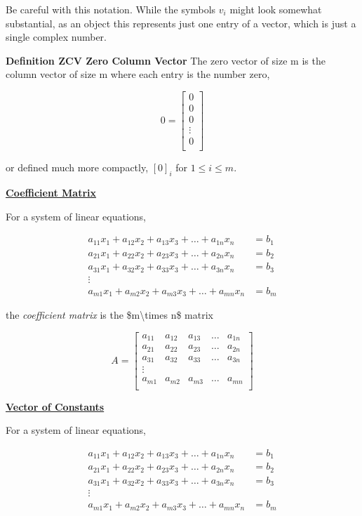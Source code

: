 \documentclass[openany]{book}
\begin{document}
Be careful with this notation. While the symbols \({v}_{i}\) might look
somewhat substantial, as an object this represents just one entry of a
vector, which is just a single complex number.

\textbf{Definition ZCV Zero Column Vector} The zero vector of size m is
the column vector of size m where each entry is the number zero,

\[
0 = \begin{bmatrix}
     0 \\
     0 \\
     0 \\
     \vdots \\
     0 \\
     \end{bmatrix}
\]

or defined much more compactly, \([0]_{i}\) for \(1\leq i\leq m\).

\protect\hyperlink{definition-cm-coefficient-matrix}{\textbf{Coefficient
Matrix}}

For a system of linear equations,

\begin{align*}
a_{11}x_1+a_{12}x_2+a_{13}x_3+\dots+a_{1n}x_n&=b_1\\
a_{21}x_1+a_{22}x_2+a_{23}x_3+\dots+a_{2n}x_n&=b_2\\
a_{31}x_1+a_{32}x_2+a_{33}x_3+\dots+a_{3n}x_n&=b_3\\
\vdots&\\
a_{m1}x_1+a_{m2}x_2+a_{m3}x_3+\dots+a_{mn}x_n&=b_m
\end{align*}

the \emph{coefficient matrix} is the \$m\textbackslash{}times n\$ matrix

\[
A=
\begin{bmatrix}
a_{11}&a_{12}&a_{13}&\dots&a_{1n}\\
a_{21}&a_{22}&a_{23}&\dots&a_{2n}\\
a_{31}&a_{32}&a_{33}&\dots&a_{3n}\\
\vdots&\\
a_{m1}&a_{m2}&a_{m3}&\dots&a_{mn}\\
\end{bmatrix}
\]

\protect\hyperlink{definition-voc-vector-of-constants}{\textbf{Vector of
Constants}}

For a system of linear equations,

\[\begin{aligned}
a_{11}x_1+a_{12}x_2+a_{13}x_3+\dots+a_{1n}x_n&=b_1\\
a_{21}x_1+a_{22}x_2+a_{23}x_3+\dots+a_{2n}x_n&=b_2\\
a_{31}x_1+a_{32}x_2+a_{33}x_3+\dots+a_{3n}x_n&=b_3\\
\vdots&\\
a_{m1}x_1+a_{m2}x_2+a_{m3}x_3+\dots+a_{mn}x_n&=b_m
\end{aligned}\]
\end{document}
